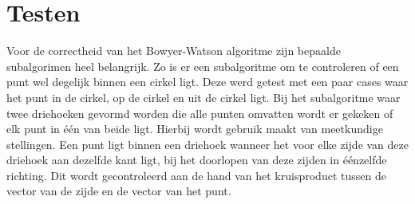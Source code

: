 \section{Testen}
Voor de correctheid van het Bowyer-Watson algoritme zijn bepaalde subalgorimen heel belangrijk. Zo is er een subalgoritme om te controleren of een punt wel degelijk binnen een cirkel ligt. Deze werd getest met een paar cases waar het punt in de cirkel, op de cirkel en uit de cirkel ligt.
Bij het subalgoritme waar twee driehoeken gevormd worden die alle punten omvatten wordt er gekeken of elk punt in één van beide ligt. Hierbij wordt gebruik maakt van meetkundige stellingen. Een punt ligt binnen een driehoek wanneer het voor elke zijde van deze driehoek aan dezelfde kant ligt, bij het doorlopen van deze zijden in éénzelfde richting. Dit wordt gecontroleerd aan de hand van het kruisproduct tussen de vector van de zijde en de vector van het punt. \cite{toepMeetkunde}